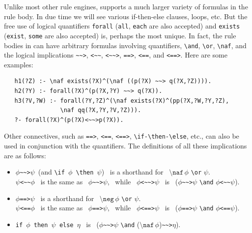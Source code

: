 \documentclass[11pt]{article}
\newcommand{\ERGO}{\mbox{\smaller{\ensuremath{\cal{E}}\smaller{{\sc{RGO}}}}}\xspace}
\newcommand{\FLSYSTEM}{\ERGO}
\newcommand{\rnafarr}{\texttt{\textasciitilde\textasciitilde>}}
\newcommand{\lnafarr}{\texttt{<\textasciitilde\textasciitilde}}
\newcommand{\rlnafarr}{\texttt{<\textasciitilde\textasciitilde>}}
\newcommand{\bs}{\textbackslash}
\newcommand{\RULELOGNAF}{{\texttt{{\bs}naf}}\xspace}
\newcommand{\RULELOGNEG}{{\texttt{{\bs}neg}}\xspace}
\begin{document}
\index{\rnafarr}
\index{\lnafarr}
\index{\rlnafarr}
\index{\url{==>}}
\index{\url{<==}}
\index{\url{<==>}}
Unlike most other rule engines, \FLSYSTEM supports a much larger variety of
formulas in the rule body. In due time we will see various if-then-else
clauses, loops, etc. But the free use of logical quantifiers
\texttt{forall} (\texttt{all}, \texttt{each} are also accepted) and
\texttt{exists} (\texttt{exist}, \texttt{some} are also accepted) is, perhaps the most unique. In fact, the rule bodies in 
\FLSYSTEM can have
arbitrary formulas involving quantifiers, \texttt{\bs{}and},
\texttt{\bs{}or}, \texttt{\RULELOGNAF}, and the logical implications \rnafarr,
\lnafarr, \rlnafarr, \texttt{==>}, \texttt{<==}, and \texttt{<==>}.
Here are some examples:
\begin{verbatim}
   h1(?Z) :- \naf exists(?X)^(\naf ((p(?X) ~~> q(?X,?Z)))).
   h2(?Y) :- forall(?X)^(p(?X,?Y) ~~> q(?X)). 
   h3(?V,?W) :- forall(?Y,?Z)^(\naf exists(?X)^(pp(?X,?W,?Y,?Z),
                \naf qq(?X,?Y,?V,?Z))).
   ?- forall(?X)^(p(?X)<~~>p(?X)).
\end{verbatim}
Other connectives, such as \texttt{==>}, \texttt{<==}, \texttt{<==>},
\texttt{\bs{}if-\bs{}then-\bs{}else}, etc., 
can also be used in conjunction with the quantifiers.
The definitions of all these implications are as follows:
\begin{itemize}
\item  $\phi$\rnafarr$\psi$\, (and
  \texttt{\bs{}if\,$\phi$\,\bs{}then\,$\psi$})~
  is a shorthand for~ $\RULELOGNAF\,\phi$
  \texttt{\bs{}or} $\psi$.\\
  $\psi$\lnafarr$\phi$~ is the same as~ $\phi$\rnafarr$\psi$,~ while~
  $\phi$\rlnafarr$\psi$~ is~ ($\phi$\rnafarr$\psi$ \texttt{\bs{}and} 
  $\phi$\lnafarr$\psi$).
\item  $\phi$\texttt{==>}$\psi$~ is a shorthand for~ $\RULELOGNEG\,\phi$
  \texttt{\bs{}or} $\psi$.\\
  $\psi$\texttt{<==}$\phi$~ is the same as~ $\phi$\texttt{==>}$\psi$,~ while~
  $\phi$\texttt{<==>}$\psi$~ is~ ($\phi$\texttt{==>}$\psi$ \texttt{\bs{}and}
  $\phi$\texttt{<==}$\psi$).
\item \texttt{if\,$\phi$\,then\,$\psi$\,else\,$\eta$}~ is~
  ($\phi$\rnafarr$\psi$ \texttt{\bs{}and}
  ($\RULELOGNAF\,\phi$)\rnafarr$\eta$).
\end{itemize}
\end{document}
